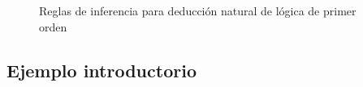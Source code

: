 \begin{figure}[H]
    \begin{multicols}{2}
        \proofTreeFalseE
        \proofTreeTrueI
    \end{multicols}
    
    \begin{multicols}{2}
        \proofTreeLEM
        \proofTreeAx
    \end{multicols}

    \proofSpacing

    \proofTreeAndI

    \begin{multicols}{2}
        \proofTreeAndEOne
        \proofTreeAndETwo
    \end{multicols}

    \proofSpacing

    \begin{multicols}{2}
        \proofTreeOrIOne
        \proofTreeOrITwo
    \end{multicols}
    
    \proofTreeOrE

    \proofSpacing

    \begin{multicols}{2}
        \proofTreeImpI
        \proofTreeImpE
    \end{multicols}
    \begin{multicols}{2}
        \proofTreeNotI
        \proofTreeNotE
    \end{multicols}

    \proofSpacing

    \begin{multicols}{2}
        \proofTreeForallI
        \proofTreeForallE
    \end{multicols}

    \proofSpacing

    \proofTreeExistsI
    \proofTreeExistsE

    \caption{Reglas de inferencia para deducción natural de lógica de primer orden}
    \label{nd:inference-rules}
\end{figure}

\subsection{Ejemplo introductorio}

